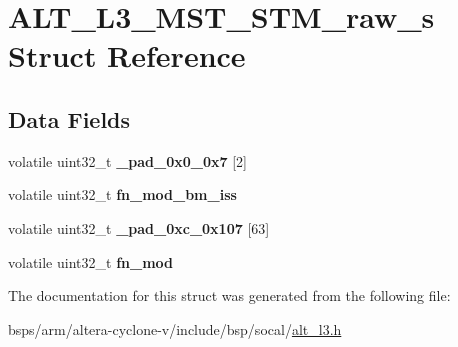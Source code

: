 \hypertarget{structALT__L3__MST__STM__raw__s}{}\section{A\+L\+T\+\_\+\+L3\+\_\+\+M\+S\+T\+\_\+\+S\+T\+M\+\_\+raw\+\_\+s Struct Reference}
\label{structALT__L3__MST__STM__raw__s}
\subsection*{Data Fields}
\begin{DoxyCompactItemize}
\item 
\mbox{\label{structALT__L3__MST__STM__raw__s_ac1a53af98df243d4837d7054b5f6bd01}} 
volatile uint32\+\_\+t {\bfseries \+\_\+pad\+\_\+0x0\+\_\+0x7} \mbox{[}2\mbox{]}
\item 
\mbox{\label{structALT__L3__MST__STM__raw__s_ad138addcddefd5a27a9a7687101dbc38}} 
volatile uint32\+\_\+t {\bfseries fn\+\_\+mod\+\_\+bm\+\_\+iss}
\item 
\mbox{\label{structALT__L3__MST__STM__raw__s_aa4919356c948a6dcbca05b64a29cf9f5}} 
volatile uint32\+\_\+t {\bfseries \+\_\+pad\+\_\+0xc\+\_\+0x107} \mbox{[}63\mbox{]}
\item 
\mbox{\label{structALT__L3__MST__STM__raw__s_a123aa344597132e1c479b0e4eb636632}} 
volatile uint32\+\_\+t {\bfseries fn\+\_\+mod}
\end{DoxyCompactItemize}


The documentation for this struct was generated from the following file\+:\begin{DoxyCompactItemize}
\item 
bsps/arm/altera-\/cyclone-\/v/include/bsp/socal/\mbox{\hyperlink{alt__l3_8h}{alt\+\_\+l3.\+h}}\end{DoxyCompactItemize}
